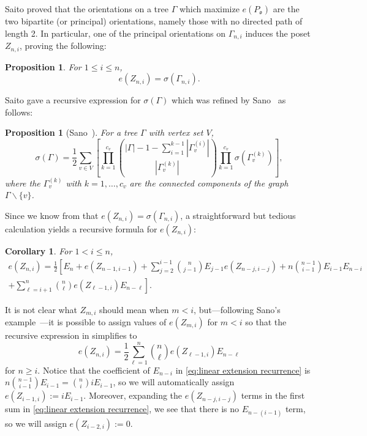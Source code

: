 \documentclass{article}
\newtheorem{proposition}[theorem]{Proposition}
\newtheorem{corollary}[theorem]{Corollary}
\theoremstyle{definition}
\begin{document}
Saito proved that the orientations on a tree $\Gamma$ which maximize $e(P_{\mathfrak{o}})$ are the two bipartite (or principal) orientations, namely those with no directed path of length 2. In particular, one of the principal orientations on $\Gamma_{n,i}$ induces the poset $Z_{n,i}$, proving the following:

\begin{proposition}\label{prop:principal numbers}
	For $1 \leq i \leq n$,
	\[
		e(Z_{n,i}) = \sigma(\Gamma_{n,i}).
	\]
\end{proposition}

Saito gave a recursive expression for $\sigma(\Gamma)$ which was refined by Sano~\cite{sanoPrincipalNumbersSaito2007} as follows:

\begin{proposition}[{Sano~\cite[Corollary~2.2]{sanoPrincipalNumbersSaito2007}}]\label{prop:principal number recurrence}
	For a tree $\Gamma$ with vertex set $V$,
	\[
		\sigma(\Gamma) = \frac{1}{2} \sum_{v \in V} \left[ \prod_{k=1}^{c_v} \binom{|\Gamma|-1-\sum_{i=1}^{k-1} |\Gamma_v^{(i)}|}{|\Gamma_v^{(k)}|}\prod_{k=1}^{c_v} \sigma(\Gamma_v^{(k)})\right],
	\]
	where the $\Gamma_v^{(k)}$ with $k=1, \dots , c_v$ are the connected components of the graph $\Gamma \backslash\{v\}$.
\end{proposition}

Since we know from  that $e(Z_{n,i}) = \sigma(\Gamma_{n,i})$, a straightforward but tedious calculation yields a recursive formula for $e(Z_{n,i})$:

\begin{corollary}\label{cor:linear extension recurrence}
	For $1 < i \leq n$,
	\begin{multline}\label{eq:linear extension recurrence}
		e(Z_{n,i}) = \frac{1}{2}\left[ E_n + e(Z_{n-1,i-1})+ \sum_{j=2}^{i-1} \binom{n}{j-1} E_{j-1}e(Z_{n-j,i-j}) + n \binom{n-1}{i-1}E_{i-1}E_{n-i} \right. \\ \left.+ \sum_{\ell=i+1}^{n}\binom{n}{\ell} e(Z_{\ell-1,i})E_{n-\ell}\right].
	\end{multline}
\end{corollary}

It is not clear what $Z_{m,i}$ should mean when $m < i$, but---following Sano's example~\cite{sanoPrincipalNumbersSaito2007}---it is possible to assign values of $e(Z_{m,i})$ for $m < i$ so that the recursive expression in  simplifies to
\begin{equation}\label{eq:simplified recurrence}
	e(Z_{n,i}) = \frac{1}{2}\sum_{\ell = 1}^n \binom{n}{\ell} e(Z_{\ell-1,i})E_{n-\ell}
\end{equation}
for $n \geq i$. Notice that the coefficient of $E_{n-i}$ in \eqref{eq:linear extension recurrence} is $n \binom{n-1}{i-1}E_{i-1} = \binom{n}{i}iE_{i-1}$, so we will automatically assign $e(Z_{i-1,i}) := i E_{i-1}$. Moreover, expanding the $e(Z_{n-j,i-j})$ terms in the first sum in \eqref{eq:linear extension recurrence}, we see that there is no $E_{n-(i-1)}$ term, so we will assign $e(Z_{i-2,i}) :=0$.
\end{document}
